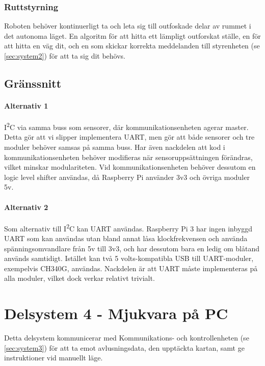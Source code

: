 \documentclass[a4paper,11pt]{article}
\begin{document}
\subsubsection{Ruttstyrning}
Roboten behöver kontinuerligt ta och leta sig till outfoskade delar av rummet i det autonoma läget. En algoritm för att hitta ett lämpligt outforskat ställe, en för att hitta en väg dit, och en som skickar korrekta meddelanden till styrenheten (se \ref{sec:system2}) för att ta sig dit behövs.

\subsection{Gränssnitt} \label{ssec:brainInterface}

\paragraph{Alternativ 1}
I\textsuperscript{2}C via samma buss som sensorer, där kommunikationsenheten agerar master. Detta gör att vi slipper implementera UART, men gör att både sensorer och tre moduler behöver samsas på samma buss. Har även nackdelen att kod i kommunikationsenheten behöver modifieras när sensoruppsättningen förändras, vilket minskar modulariteten.
Vid kommunikationsenheten behöver dessutom en logic level shifter användas, då Raspberry Pi använder 3v3 och övriga moduler 5v.

\paragraph{Alternativ 2}
Som alternativ till I\textsuperscript{2}C kan UART användas. Raspberry Pi 3 har ingen inbyggd UART som kan användas utan bland annat låsa klockfrekvensen och använda spänningsomvandlare från 5v till 3v3, och har dessutom bara en ledig om blåtand används samtidigt. Istället kan två 5 volts-kompatibla USB till UART-moduler, exempelvis CH340G, användas. Nackdelen är att UART måste implementeras på alla moduler, vilket dock verkar relativt trivialt. %

\newpage
\section{Delsystem 4 - Mjukvara på PC} \label{sec:system4}
Detta delsystem kommunicerar med Kommunikations- och kontrollenheten (se \ref{sec:system3}) för att ta emot avlusningsdata, den upptäckta kartan, samt ge instruktioner vid manuellt läge.
\end{document}

